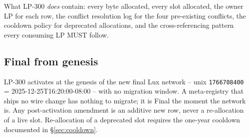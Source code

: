 What LP-300 \emph{does} contain: every byte allocated, every slot
allocated, the owner LP for each row, the conflict resolution
log for the four pre-existing conflicts, the cooldown policy for
deprecated allocations, and the cross-referencing pattern every
consuming LP MUST follow.

\subsection{Final from genesis}

LP-300 activates at the genesis of the new final Lux network --
unix \texttt{1766708400} = 2025-12-25T16:20:00-08:00 -- with no
migration window. A meta-registry that ships no wire change has
nothing to migrate; it is Final the moment the network is. Any
post-activation amendment is an additive new row, never a
re-allocation of a live slot. Re-allocation of a deprecated slot
requires the one-year cooldown documented in
\S\ref{sec:cooldown}.
